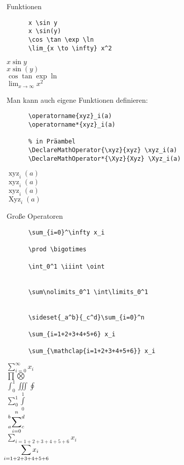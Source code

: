 \begin{frame}[fragile]{Funktionen}
  \begin{CodeExample}{0.70}
    \begin{lstlisting}
      x \sin y
      x \sin(y)
      \cos \tan \exp \ln
      \lim_{x \to \infty} x^2
    \end{lstlisting}
  \CodeResult
    $x \sin y$ \\
    $x \sin(y)$ \\
    $\cos \tan \exp \ln$ \\
    $\displaystyle \lim_{x \to \infty} x^2$
  \end{CodeExample}
  \vspace{5pt}
  Man kann auch eigene Funktionen definieren:
  \vspace{-1em}
  \begin{CodeExample}{0.70}
    \begin{lstlisting}
      \operatorname{xyz}_i(a)
      \operatorname*{xyz}_i(a)

      % in Präambel
      \DeclareMathOperator{\xyz}{xyz} \xyz_i(a)
      \DeclareMathOperator*{\Xyz}{Xyz} \Xyz_i(a)
    \end{lstlisting}
  \CodeResult
    $\operatorname{xyz}_i(a)$ \\
    $\displaystyle \operatorname*{xyz}_i(a)$ \\[\baselineskip]
    $\operatorname{xyz}_i(a)$ \\
    $\displaystyle \operatorname*{Xyz}_i(a)$
  \end{CodeExample}
\end{frame}

\begin{frame}[fragile]{Große Operatoren}
  \begin{CodeExample}{0.70}
    \begin{lstlisting}
      \sum_{i=0}^\infty x_i

      \prod \bigotimes

      \int_0^1 \iiint \oint


      \sum\nolimits_0^1 \int\limits_0^1


      \sideset{_a^b}{_c^d}\sum_{i=0}^n

      \sum_{i=1+2+3+4+5+6} x_i

      \sum_{\mathclap{i=1+2+3+4+5+6}} x_i
    \end{lstlisting}
  \CodeResult
    $\displaystyle \sum_{i=0}^\infty x_i$ \\
    $\displaystyle \prod \bigotimes$ \\
    $\displaystyle \int_0^1 \iiint \oint$  \\
    $\displaystyle \sum\nolimits_0^1 \int\limits_0^1$ \\
    $\displaystyle \sideset{_a^b}{_c^d}\sum_{i=0}^n$ \\
    $\displaystyle \sum_{i=1+2+3+4+5+6} x_i$ \\
    $\displaystyle \qquad \sum_{\mathclap{i=1+2+3+4+5+6}} x_i$
  \end{CodeExample}
\end{frame}

